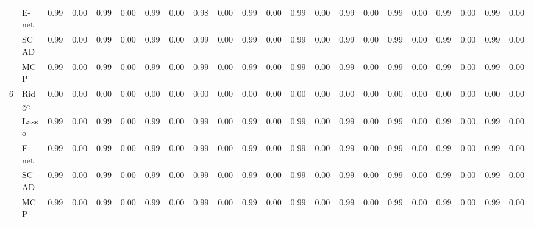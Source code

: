 \begin{tabular}{ll|ll|llllll|llllll|llllll}
 & E-net  & $0.9994$ & $0.0003$ & $0.9989$ & $0.0010$ & $0.9957$ & $0.0027$ & $0.9892$ & $0.0026$ & $0.9993$ & $0.0003$ & $0.9993$ & $0.0004$ & $0.9985$ & $0.0004$ & $0.9991$ & $0.0004$ & $0.9981$ & $0.0011$ & $0.9944$ & $0.0013$ \\
 & SCAD  & $0.9943$ & $0.0057$ & $0.9909$ & $0.0058$ & $0.9920$ & $0.0031$ & $0.9989$ & $0.0007$ & $0.9926$ & $0.0068$ & $0.9949$ & $0.0053$ & $0.9960$ & $0.0045$ & $0.9936$ & $0.0051$ & $0.9928$ & $0.0048$ & $0.9980$ & $0.0021$ \\
 & MCP  & $0.9970$ & $0.0027$ & $0.9960$ & $0.0023$ & $0.9973$ & $0.0012$ & $0.9993$ & $0.0002$ & $0.9968$ & $0.0025$ & $0.9973$ & $0.0022$ & $0.9980$ & $0.0021$ & $0.9970$ & $0.0020$ & $0.9971$ & $0.0016$ & $0.9987$ & $0.0011$ \\\hline
6 & Ridge  & $0.0000$ & $0.0000$ & $0.0000$ & $0.0000$ & $0.0000$ & $0.0000$ & $0.0000$ & $0.0000$ & $0.0000$ & $0.0000$ & $0.0000$ & $0.0000$ & $0.0000$ & $0.0000$ & $0.0000$ & $0.0000$ & $0.0000$ & $0.0000$ & $0.0000$ & $0.0000$ \\
 & Lasso  & $0.9995$ & $0.0000$ & $0.9995$ & $0.0000$ & $0.9993$ & $0.0005$ & $0.9977$ & $0.0015$ & $0.9995$ & $0.0000$ & $0.9995$ & $0.0000$ & $0.9994$ & $0.0002$ & $0.9995$ & $0.0000$ & $0.9995$ & $0.0001$ & $0.9988$ & $0.0009$ \\
 & E-net  & $0.9995$ & $0.0000$ & $0.9995$ & $0.0000$ & $0.9992$ & $0.0007$ & $0.9964$ & $0.0024$ & $0.9995$ & $0.0000$ & $0.9995$ & $0.0000$ & $0.9992$ & $0.0003$ & $0.9995$ & $0.0000$ & $0.9995$ & $0.0001$ & $0.9982$ & $0.0013$ \\
 & SCAD  & $0.9970$ & $0.0043$ & $0.9956$ & $0.0043$ & $0.9964$ & $0.0031$ & $0.9969$ & $0.0032$ & $0.9960$ & $0.0060$ & $0.9970$ & $0.0045$ & $0.9979$ & $0.0029$ & $0.9970$ & $0.0034$ & $0.9975$ & $0.0029$ & $0.9982$ & $0.0020$ \\
 & MCP  & $0.9985$ & $0.0022$ & $0.9982$ & $0.0018$ & $0.9988$ & $0.0010$ & $0.9992$ & $0.0003$ & $0.9985$ & $0.0019$ & $0.9989$ & $0.0011$ & $0.9990$ & $0.0010$ & $0.9989$ & $0.0013$ & $0.9989$ & $0.0011$ & $0.9990$ & $0.0009$ \\
\hline 
\end{tabular}

